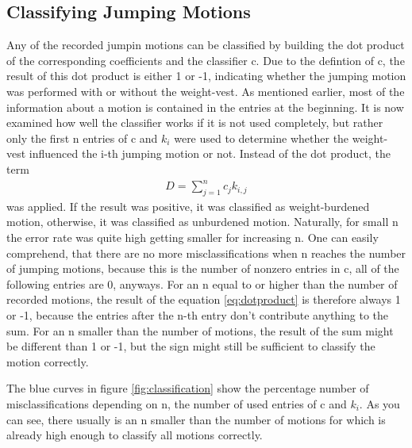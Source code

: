 \documentclass[a4paper]{article}
\begin{document}
\subsection{Classifying Jumping Motions}

Any of the recorded jumpin motions can be classified by building the dot product of the corresponding coefficients and the classifier c.
Due to the defintion of c, the result of this dot product is either 1 or -1, indicating whether the jumping motion was performed with or without the weight-vest.
As mentioned earlier, most of the information about a motion is contained in the entries at the beginning.
It is now examined how well the classifier works if it is not used completely, but rather only the first n entries of c and $k_{i}$ were used to determine whether the weight-vest influenced the i-th jumping motion or not.
Instead of the dot product, the term
\begin{align}
	D=\sum\limits_{j=1}^n c_{j} k_{i,j} \label{eq:dotproduct}
\end{align} 
was applied. If the result was positive, it was classified as weight-burdened motion, otherwise, it was classified as unburdened motion.
Naturally, for small n the error rate was quite high getting smaller for increasing n.
One can easily comprehend, that there are no more misclassifications when n reaches the number of jumping motions, because this is the number of nonzero entries in c, all of the following entries are 0, anyways.
For an n equal to or higher than the number of recorded motions, the result of the equation \ref{eq:dotproduct} is therefore always 1 or -1, because the entries after the n-th entry don't contribute anything to the sum.
For an n smaller than the number of motions, the result of the sum might be different than 1 or -1, but the sign might still be sufficient to classify the motion correctly.

The blue curves in figure \ref{fig:classification} show the percentage number of misclassifications depending on n, the number of used entries of c and $k_{i}$. As you can see, there usually is an n smaller than the number of motions for which is already high enough to classify all motions correctly.
\end{document}

